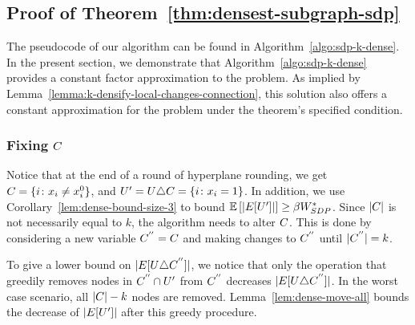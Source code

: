 \subsection{Proof of Theorem~\ref{thm:densest-subgraph-sdp}}
\label{sec:proof:thm-densest-subgraph-overview}

The pseudocode of our algorithm can be found in
Algorithm~\ref{algo:sdp-k-dense}. In the present section, we demonstrate that
Algorithm~\ref{algo:sdp-k-dense} provides a constant factor approximation to the \kdense problem. As implied by Lemma~\ref{lemma:k-densify-local-changes-connection}, this solution also offers a constant approximation for the \dskc problem under the theorem's specified condition.


\subsubsection{Fixing $C$}
\label{sec:proof:subgraph-sdp:fix-c}
Notice that at the end of a round of hyperplane rounding, we get $C = \{i \colon x_i \neq x_i^0\}$, and $U' = U \triangle C = \{i \colon x_i = 1\}$. 
In addition, we use Corollary~\ref{lem:dense-bound-size-3} to bound $\mathbb{E}\left[ \lvert E[U']\rvert \right] \geq \beta W_{{\small SDP}}^*$. 
Since $\lvert C\rvert$ is not necessarily equal to $k$, the algorithm needs to alter $C$. 
This is done by considering a new variable $C^{''}=C$ and
making changes to $C^{''}$ until $\lvert C^{''}\rvert = k$. 

To give a lower bound on $\lvert E[U \triangle C^{''}]\rvert$, we notice that only the operation that greedily removes nodes in $C^{''} \cap U'$ from $C^{''}$ decreases $\lvert E[U \triangle C^{''}]\rvert$. In the worst case scenario, all $\lvert 
C\rvert - k$ nodes are removed.
Lemma~\ref{lem:dense-move-all} bounds the decrease of $\lvert E[U']\rvert$ after this greedy procedure. 

\densemoveall* 

